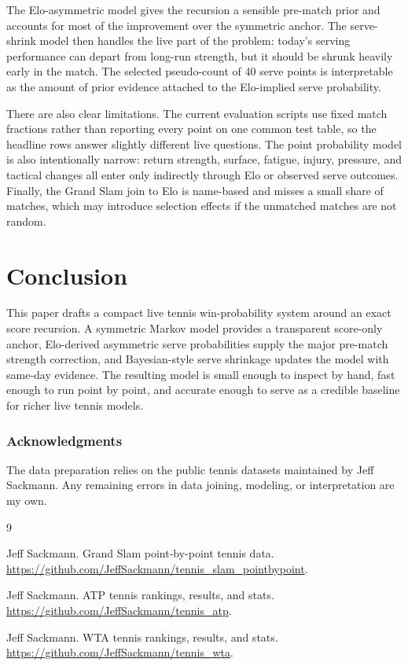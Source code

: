 \documentclass{article} %
\begin{document}
The Elo-asymmetric model gives the recursion a sensible pre-match prior and
accounts for most of the improvement over the symmetric anchor. The serve-shrink
model then handles the live part of the problem: today's serving performance can
depart from long-run strength, but it should be shrunk heavily early in the
match. The selected pseudo-count of 40 serve points is interpretable as the
amount of prior evidence attached to the Elo-implied serve probability.

There are also clear limitations. The current evaluation scripts use fixed
match fractions rather than reporting every point on one common test table, so
the headline rows answer slightly different live questions. The point
probability model is also intentionally narrow: return strength, surface,
fatigue, injury, pressure, and tactical changes all enter only indirectly
through Elo or observed serve outcomes. Finally, the Grand Slam join to Elo is
name-based and misses a small share of matches, which may introduce selection
effects if the unmatched matches are not random.

\section{Conclusion}

This paper drafts a compact live tennis win-probability system around an exact
score recursion. A symmetric Markov model provides a transparent score-only
anchor, Elo-derived asymmetric serve probabilities supply the major pre-match
strength correction, and Bayesian-style serve shrinkage updates the model with
same-day evidence. The resulting model is small enough to inspect by hand, fast
enough to run point by point, and accurate enough to serve as a credible
baseline for richer live tennis models.

\subsubsection*{Acknowledgments}
The data preparation relies on the public tennis datasets maintained by Jeff
Sackmann. Any remaining errors in data joining, modeling, or interpretation are
my own.

\begin{thebibliography}{9}

Jeff Sackmann.
\newblock Grand Slam point-by-point tennis data.
\newblock \url{https://github.com/JeffSackmann/tennis_slam_pointbypoint}.

Jeff Sackmann.
\newblock ATP tennis rankings, results, and stats.
\newblock \url{https://github.com/JeffSackmann/tennis_atp}.

Jeff Sackmann.
\newblock WTA tennis rankings, results, and stats.
\newblock \url{https://github.com/JeffSackmann/tennis_wta}.

\end{thebibliography}
\end{document}
